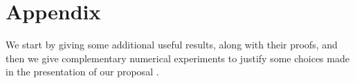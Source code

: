 







\section{Appendix}
\label{sec:6:appendix}

We start by giving some additional useful results, along with their proofs, and then we give complementary numerical experiments to justify some choices made in the presentation of our proposal \GLRklUCB.


